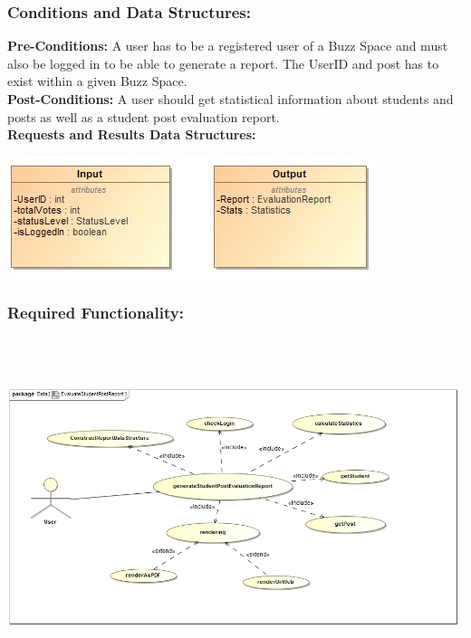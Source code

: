 \documentclass[a4paper,11pt]{article}
\begin{document}
\subsubsection{Conditions and Data Structures:}
\textbf{Pre-Conditions:}
A user has to be a registered user of a Buzz Space and must also be logged in to be able to generate a report. The UserID and post has to exist within a given Buzz Space.\\
\textbf{Post-Conditions:}
A user should get statistical information about students and posts as well as a student post evaluation report.\\
\textbf{Requests and Results Data Structures:}
\begin{center}
\includegraphics{Images/Report/Input&Output}
\end{center}
\subsubsection{Required Functionality:} 
\includegraphics[width=15cm,height=10cm]{./Images/Report/studentPost_FR}\\
\end{document}
